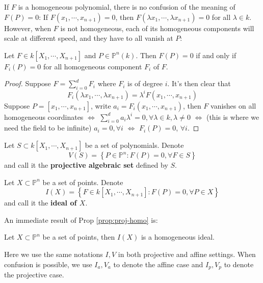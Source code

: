 \documentclass{note-eng}
\begin{document}
If $F$ is a homogeneous polynomial, there is no confusion of the meaning of $F(P) = 0$: If $F(x_1, \cdots, x_{n + 1}) = 0$, then $F(\lambda x_1, \cdots, \lambda x_{n + 1}) = 0$ for all $\lambda \in k$. However, when $F$ is not homogeneous, each of its homogeneous components will scale at different speed, and they have to all vanish at $P$:

\begin{proposition}\label{prop:proj-homo}
    Let $F \in k[X_1, \cdots, X_{n + 1}]$ and $P \in \mathbb{P}^n(k)$. Then $F(P) = 0$ if and only if $F_i(P) = 0$ for all homogeneous component $F_i$ of $F$.
\end{proposition}

\begin{proof}
    Suppose $F = \sum\limits_{i = 0}^{d} F_i$ where $F_i$ is of degree $i$. It's then clear that
    $$F_i(\lambda x_1, \cdots, \lambda x_{n + 1}) = \lambda^i F(x_1, \cdots, x_{n + 1})$$
    Suppose $P = [x_1, \cdots, x_{n + 1}]$, write $a_i = F_i (x_1, \cdots, x_{n + 1})$, then $F$ vanishes on all homogeneous coordinates $\Leftrightarrow$ $\sum\limits_{i = 0}^{d} a_i \lambda^i = 0, \forall \lambda \in k, \lambda \ne 0$ $\Leftrightarrow$ (this is where we need the field to be infinite) $a_i = 0, \forall i$ $\Leftrightarrow$ $F_i(P) = 0$, $\forall i$.
\end{proof}

\begin{definition}
    Let $S \subset k[X_1, \cdots, X_{n + 1}]$ be a set of polynomials. Denote
    $$V(S) = \left\lbrace P \in \mathbb{P}^n: F(P) = 0, \forall F \in S \right\rbrace$$
    and call it the \textbf{projective algebraic set} defined by $S$.
\end{definition}

\begin{definition}
    Let $X \subset \mathbb{P}^n$ be a set of points. Denote
    $$I(X) = \left\lbrace F \in k[X_1, \cdots, X_{n + 1}]: F(P) = 0, \forall P \in X \right\rbrace$$
    and call it the \textbf{ideal of $X$}.
\end{definition}

An immediate result of Prop \ref{prop:proj-homo} is:

\begin{corollary}
    Let $X \subset \mathbb{P}^n$ be a set of points, then $I(X)$ is a homogeneous ideal.
\end{corollary}

Here we use the same notations $I, V$ in both projective and affine settings. When confusion is possible, we use $I_a, V_a$ to denote the affine case and $I_p, V_p$ to denote the projective case.
\end{document}
